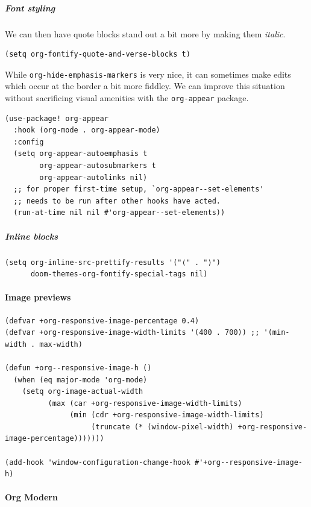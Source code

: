 \documentclass[11pt]{article}
\begin{document}
\subparagraph{Font styling}
\label{sec:orgb16dd84}
We can then have quote blocks stand out a bit more by making them \emph{italic}.

\begin{verbatim}
(setq org-fontify-quote-and-verse-blocks t)
\end{verbatim}

While \texttt{org-hide-emphasis-markers} is very nice, it can sometimes make edits which
occur at the border a bit more fiddley. We can improve this situation without
sacrificing visual amenities with the \texttt{org-appear} package.

\begin{verbatim}
(use-package! org-appear
  :hook (org-mode . org-appear-mode)
  :config
  (setq org-appear-autoemphasis t
        org-appear-autosubmarkers t
        org-appear-autolinks nil)
  ;; for proper first-time setup, `org-appear--set-elements'
  ;; needs to be run after other hooks have acted.
  (run-at-time nil nil #'org-appear--set-elements))
\end{verbatim}

\subparagraph{Inline blocks}
\label{sec:org6dc4c66}

\begin{verbatim}
(setq org-inline-src-prettify-results '("⟨" . "⟩")
      doom-themes-org-fontify-special-tags nil)
\end{verbatim}

\paragraph{Image previews}
\label{sec:org9f3ca76}

\begin{verbatim}
(defvar +org-responsive-image-percentage 0.4)
(defvar +org-responsive-image-width-limits '(400 . 700)) ;; '(min-width . max-width)

(defun +org--responsive-image-h ()
  (when (eq major-mode 'org-mode)
    (setq org-image-actual-width
          (max (car +org-responsive-image-width-limits)
               (min (cdr +org-responsive-image-width-limits)
                    (truncate (* (window-pixel-width) +org-responsive-image-percentage)))))))

(add-hook 'window-configuration-change-hook #'+org--responsive-image-h)
\end{verbatim}

\paragraph{Org Modern}
\label{sec:org1497f92}
\end{document}
